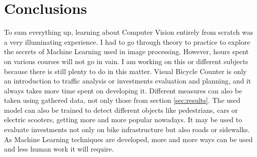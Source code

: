 \chapter{Conclusions}
\label{cha:conclusions}
To sum everything up, learning about Computer Vision entirely from scratch was a very illuminating experience. I had to go through theory to practice to explore the secrets of Machine Learning used in image processing. However, hours spent on various courses will not go in vain. I am working on this or different subjects because there is still plenty to do in this matter. Visual Bicycle Counter is only an introduction to traffic analysis or investments evaluation and planning, and it always takes more time spent on developing it. Different measures can also be taken using gathered data, not only those from section \ref{sec:results}. The used model can also be trained to detect different objects like pedestrians, cars or electric scooters, getting more and more popular nowadays. It may be used to evaluate investments not only on bike infrastructure but also roads or sidewalks. As Machine Learning techniques are developed, more and more ways can be used and less human work it will require.